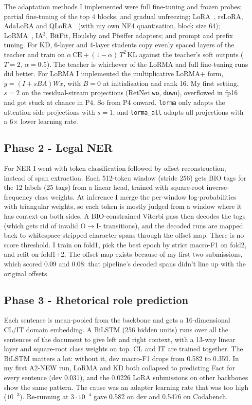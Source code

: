 \documentclass[11pt, oneside]{article}
\begin{document}
The adaptation methods I implemented were full fine-tuning and frozen probes;
partial fine-tuning of the top 4 blocks, and gradual unfreezing;
LoRA~\cite{hu2022lora}, rsLoRA, AdaLoRA and QLoRA~\cite{dettmers2023qlora} (with my own NF4
quantisation, block size 64); LoRMA~\cite{bihany2025lorma}, IA$^3$, BitFit, Houlsby and
Pfeiffer adapters; and prompt and prefix tuning. For KD, 6-layer and 4-layer
students copy evenly spaced layers of the teacher and train on
$\alpha\,\text{CE} + (1-\alpha)\,T^2\,\text{KL}$ against the teacher's soft
outputs ($T{=}2$, $\alpha{=}0.5$). The teacher is whichever of the LoRMA and
full fine-tuning runs did better.
For LoRMA I implemented the multiplicative LoRMA+ form,
$y = (I + sBA)Wx$, with $B = 0$ at initialisation and rank 16. My first
setting, $s = 2$ on the residual-stream projections (RetNet \texttt{wo},
\texttt{down}), overflowed in fp16 and got stuck at chance in P4. So from P4
onward, \texttt{lorma} only adapts the attention-side projections with
$s = 1$, and \texttt{lorma\_all} adapts all projections with a 6$\times$ lower
learning rate.

\subsection{Phase 2 - Legal NER}
For NER I went with token classification followed by offset reconstruction,
instead of span extraction. Each 512-token window (stride 256) gets BIO tags
for the 12 labels (25 tags) from a linear head, trained with square-root
inverse-frequency class weights. At inference I merge the per-window
log-probabilities with triangular weights, so each token is mostly judged from
a window where it has context on both sides. A BIO-constrained Viterbi pass
then decodes the tags (which gets rid of invalid O$\rightarrow$I- transitions),
and the decoded runs are mapped back to whitespace-stripped character spans
through the offset map. There is no score threshold. I train on fold1, pick
the best epoch by strict macro-F1 on fold2, and refit on fold1+2.
The offset map exists because of my first two submissions, which scored 0.09
and 0.08: that pipeline's decoded spans didn't line up with the original
offsets.

\subsection{Phase 3 - Rhetorical role prediction}
Each sentence is mean-pooled from the backbone and gets a 16-dimensional CL/IT
domain embedding. A BiLSTM (256 hidden units) runs over all the sentences of
the document to give left and right context, with a 13-way linear layer and
square-root class weights on top. CL and IT are trained together. The BiLSTM
matters a lot: without it, dev macro-F1 drops from 0.582 to 0.359.
In my first A2-NEW run, LoRMA and KD both collapsed to predicting Fact for
every sentence (dev 0.031), and the 0.0226 LoRA submissions on other backbones
show the same pattern. The cause was an adapter learning rate that was too
high ($10^{-3}$). Re-running at $3\cdot10^{-4}$ gave 0.582 on dev and 0.5476
on Codabench.
\end{document}
